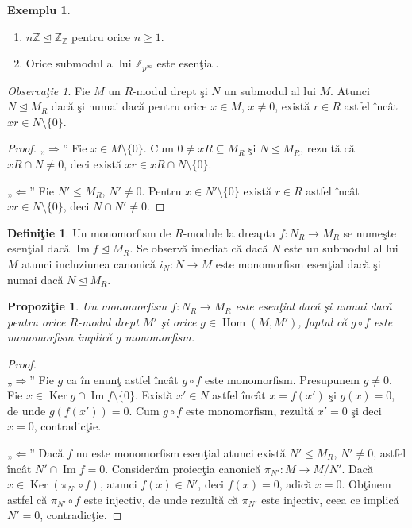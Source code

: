 \documentclass[12pt,a4paper]{book}
\DeclareMathOperator{\Ker}{Ker}
\DeclareMathOperator{\Hom}{Hom}
\newcommand{\ess}{\trianglelefteq}  %
\theoremstyle{plain}
\newtheorem{proposition}[theorem]{Propoziţie}
\theoremstyle{definition}
\newtheorem{definition}[theorem]{Definiţie}
\newtheorem*{example*}{Exemplu}         %
\theoremstyle{remark}
\newtheorem{remark}[theorem]{Observaţie}
\begin{document}
\begin{example*}
\leavevmode
\begin{enumerate}
  \item \(n\mathbb{Z} \ess \mathbb{Z}_\mathbb{Z}\) pentru orice \(n \geq 1\).
  \item Orice submodul al lui \(\mathbb{Z}_{p^\infty}\) este esenţial.
\end{enumerate}
\end{example*}

  
\begin{remark}
Fie \(M\) un \(R\)-modul drept şi \(N\) un submodul al lui \(M\).
Atunci \(N \ess M_R\) dacă şi numai dacă pentru orice \(x \in M\),
\(x \neq 0\), există \(r \in R\) astfel încât \(xr \in N \setminus \{0\}\).
\end{remark}

\begin{proof}
„\(\Rightarrow\)” Fie \(x \in M \setminus \{0\}\).
Cum \(0 \neq xR \subseteq M_R\) şi \(N \ess M_R\), rezultă că
\(xR \cap N \neq 0\), deci există \(xr \in xR \cap N \setminus \{0\}\).

„\(\Leftarrow\)” Fie \(N' \leq M_R\), \(N' \neq 0\).
Pentru \(x \in N' \setminus \{0\}\) există \(r \in R\) astfel încât
\(xr \in N \setminus \{0\}\), deci \(N \cap N' \neq 0\).
\end{proof}

\begin{definition}
Un monomorfism de \(R\)-module la dreapta \(f : N_R \to M_R\) se numeşte
esenţial dacă \(\operatorname{Im} f \ess M_R\).
Se observă imediat că dacă \(N\) este un submodul al lui \(M\) atunci
incluziunea canonică \(i_N : N \to M\) este monomorfism esenţial
dacă şi numai dacă \(N \ess M_R\).
\end{definition}

\begin{proposition}
Un monomorfism \(f : N_R \to M_R\) este esenţial dacă şi numai dacă
pentru orice \(R\)-modul drept \(M'\) şi orice \(g \in \Hom(M,M')\),
faptul că \(g \circ f\) este monomorfism implică \(g\) monomorfism.
\end{proposition}

\begin{proof}
\mbox{}\\[0.5em]
„\(\Rightarrow\)” Fie \(g\) ca în enunţ astfel încât \(g \circ f\) este
monomorfism. Presupunem \(g \neq 0\).
Fie \(x \in \Ker g \cap \operatorname{Im} f \setminus \{0\}\).
Există \(x' \in N\) astfel încât \(x = f(x')\) şi \(g(x) = 0\), de unde
\(g(f(x')) = 0\). Cum \(g \circ f\) este monomorfism, rezultă \(x' = 0\) şi
deci \(x = 0\), contradicţie.

„\(\Leftarrow\)” Dacă \(f\) nu este monomorfism esenţial atunci există
\(N' \leq M_R\), \(N' \neq 0\), astfel încât \(N' \cap \operatorname{Im} f = 0\).
Considerăm proiecţia canonică \(\pi_{N'} : M \to M/N'\).
Dacă \(x \in \Ker(\pi_{N'} \circ f)\), atunci \(f(x) \in N'\), deci \(f(x) = 0\),
adică \(x = 0\). Obţinem astfel că \(\pi_{N'} \circ f\) este injectiv, de unde
rezultă că \(\pi_{N'}\) este injectiv, ceea ce implică \(N' = 0\),
contradicţie.
\end{proof}
\end{document}
